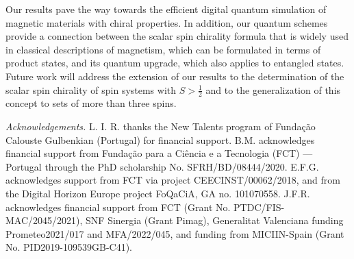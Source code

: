 \documentclass[aps,prl,twocolumn]{revtex4}
\begin{document}
Our results pave the way towards the efficient digital quantum simulation of magnetic materials with chiral properties. In addition, our quantum schemes provide a connection between the scalar spin chirality formula that is widely used in classical descriptions of magnetism, which can be formulated in terms of product states, and its quantum upgrade, which also applies to entangled states. Future work will address the extension of our results to the determination of the scalar spin chirality of spin systems with $S>\frac{1}{2}$ and to the generalization of this concept to sets of more than three spins.










 
%
{\em Acknowledgements.} L. I. R. thanks the New Talents program of Funda\c{c}\~{a}o Calouste Gulbenkian (Portugal) for financial support. B.M. acknowledges financial support from Funda\c{c}\~{a}o para a Ci\^{e}ncia e a Tecnologia (FCT) --- Portugal through the PhD scholarship No. SFRH/BD/08444/2020. E.F.G. acknowledges support from FCT via project CEECINST/00062/2018, and from the Digital Horizon Europe project FoQaCiA, GA no. 101070558. J.F.R.  acknowledges financial support from 
 FCT (Grant No. PTDC/FIS-MAC/2045/2021),
 SNF Sinergia (Grant Pimag),
Generalitat Valenciana funding Prometeo2021/017
and MFA/2022/045,
and
 funding from
MICIIN-Spain (Grant No. PID2019-109539GB-C41).









{}
\end{document}
